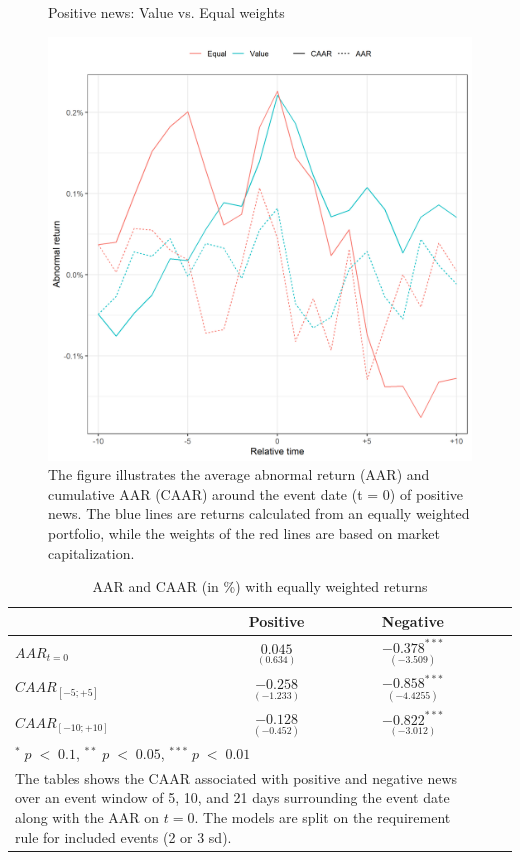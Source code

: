 \begin{figure} [H]
    \centering
    \caption{Positive news: Value vs. Equal weights}
    \includegraphics[scale=0.6]{Projekt/1.Figures analysis/ST_positive_sensitivity_weight.png}
     \caption*{\footnotesize The figure illustrates the average abnormal return (AAR) and cumulative AAR (CAAR) around the event date (t = 0) of positive news. The blue lines are returns calculated from an equally weighted portfolio, while the weights of the red lines are based on market capitalization. }
    \label{fig:ST_pos_sensitivity_weights}
\end{figure} 


\begin{table}[H]
\centering
\caption{AAR and CAAR (in \%) with equally weighted returns} 
\begin{tabular}{lcccc}
  \hline  \hline
  & \multicolumn{1}{c}{Positive} &  \multicolumn{1}{c}{Negative}\\  
 \hline
$AAR_{t=0}$ &  $\underset{(0.634)}{0.045}$ & $\underset{(-3.509)}{-0.378^{***}}$ \\  
$CAAR_{[-5;+5]}$  & $\underset{(-1.233)}{-0.258}$ & $\underset{(-4.4255)}{-0.858^{***}}$ \\ 
$CAAR_{[-10;+10]}$    & $\underset{(-0.452)}{-0.128 }$ & $\underset{(-3.012)}{-0.822^{***}}$ \\ 
   \hline \hline
   \multicolumn{3}{p{10cm}}{ \footnotesize $^* \; p\; <\; 0.1$, $ ^{**} \; p\; <\; 0.05$, $ ^{***} \; p\; <\; 0.01$  } \\
   \multicolumn{3}{p{10cm}}{\footnotesize The tables shows the CAAR associated with positive and negative news over an event window of 5, 10, and 21 days surrounding the event date along with the AAR on $t=0$. The models are split on the requirement rule for included events (2 or 3 sd).} \\
   \hline
\end{tabular}
\label{tab:ST_sensitivity_weights}
\end{table}

